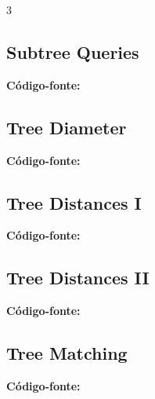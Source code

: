 \documentclass[8pt]{extarticle}
\begin{document}
\begin{multicols*}{3}
\subsection{Subtree Queries}
\begin{caixaenunciado}

\end{caixaenunciado}
\vspace{0.3cm}
\noindent\textbf{Código-fonte:}


\subsection{Tree Diameter}
\begin{caixaenunciado}

\end{caixaenunciado}
\vspace{0.3cm}
\noindent\textbf{Código-fonte:}


\subsection{Tree Distances I}
\begin{caixaenunciado}

\end{caixaenunciado}
\vspace{0.3cm}
\noindent\textbf{Código-fonte:}


\subsection{Tree Distances II}
\begin{caixaenunciado}

\end{caixaenunciado}
\vspace{0.3cm}
\noindent\textbf{Código-fonte:}


\subsection{Tree Matching}
\begin{caixaenunciado}

\end{caixaenunciado}
\vspace{0.3cm}
\noindent\textbf{Código-fonte:}

\end{multicols*}
\end{document}
